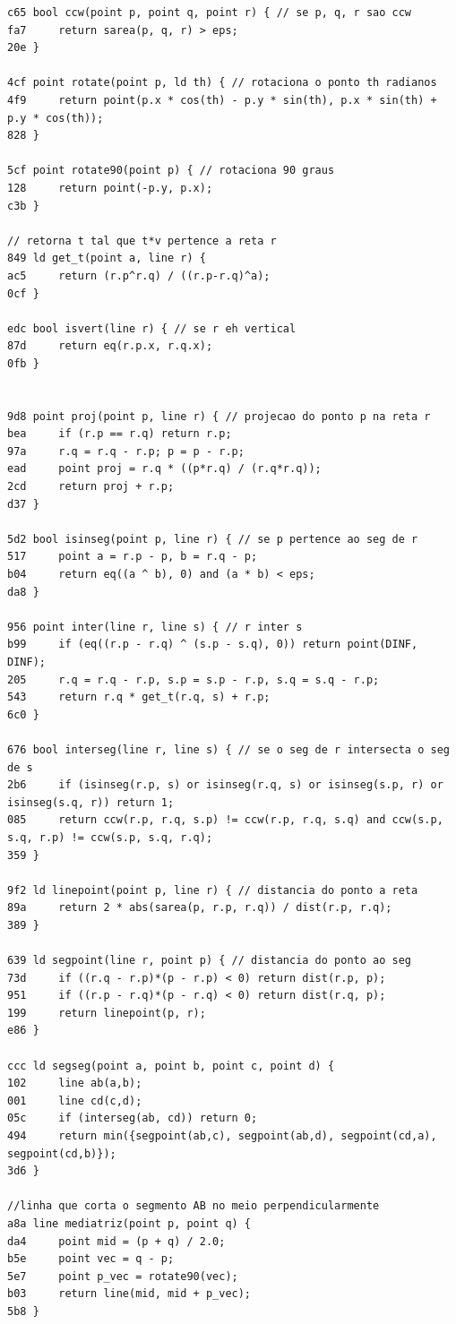 \documentclass[11pt, a4paper, twoside]{article}
\begin{document}
\begin{lstlisting}
c65 bool ccw(point p, point q, point r) { // se p, q, r sao ccw
fa7 	return sarea(p, q, r) > eps;
20e }

4cf point rotate(point p, ld th) { // rotaciona o ponto th radianos
4f9 	return point(p.x * cos(th) - p.y * sin(th), p.x * sin(th) + p.y * cos(th));
828 }

5cf point rotate90(point p) { // rotaciona 90 graus
128 	return point(-p.y, p.x);
c3b }

// retorna t tal que t*v pertence a reta r
849 ld get_t(point a, line r) { 
ac5 	return (r.p^r.q) / ((r.p-r.q)^a);
0cf }

edc bool isvert(line r) { // se r eh vertical
87d 	return eq(r.p.x, r.q.x);
0fb }


9d8 point proj(point p, line r) { // projecao do ponto p na reta r
bea 	if (r.p == r.q) return r.p;
97a 	r.q = r.q - r.p; p = p - r.p;
ead 	point proj = r.q * ((p*r.q) / (r.q*r.q));
2cd 	return proj + r.p;
d37 }

5d2 bool isinseg(point p, line r) { // se p pertence ao seg de r
517     point a = r.p - p, b = r.q - p;
b04     return eq((a ^ b), 0) and (a * b) < eps;
da8 }

956 point inter(line r, line s) { // r inter s
b99 	if (eq((r.p - r.q) ^ (s.p - s.q), 0)) return point(DINF, DINF);
205 	r.q = r.q - r.p, s.p = s.p - r.p, s.q = s.q - r.p;
543 	return r.q * get_t(r.q, s) + r.p;
6c0 }

676 bool interseg(line r, line s) { // se o seg de r intersecta o seg de s
2b6 	if (isinseg(r.p, s) or isinseg(r.q, s) or isinseg(s.p, r) or isinseg(s.q, r)) return 1;
085 	return ccw(r.p, r.q, s.p) != ccw(r.p, r.q, s.q) and ccw(s.p, s.q, r.p) != ccw(s.p, s.q, r.q);
359 }

9f2 ld linepoint(point p, line r) { // distancia do ponto a reta
89a 	return 2 * abs(sarea(p, r.p, r.q)) / dist(r.p, r.q);
389 }

639 ld segpoint(line r, point p) { // distancia do ponto ao seg
73d 	if ((r.q - r.p)*(p - r.p) < 0) return dist(r.p, p);
951 	if ((r.p - r.q)*(p - r.q) < 0) return dist(r.q, p);
199 	return linepoint(p, r);
e86 }

ccc ld segseg(point a, point b, point c, point d) {
102 	line ab(a,b);
001 	line cd(c,d);
05c     if (interseg(ab, cd)) return 0; 
494 	return min({segpoint(ab,c), segpoint(ab,d), segpoint(cd,a), segpoint(cd,b)});
3d6 }

//linha que corta o segmento AB no meio perpendicularmente
a8a line mediatriz(point p, point q) {
da4     point mid = (p + q) / 2.0;
b5e     point vec = q - p;
5e7     point p_vec = rotate90(vec);
b03     return line(mid, mid + p_vec);
5b8 }


\end{lstlisting}
\end{document}
